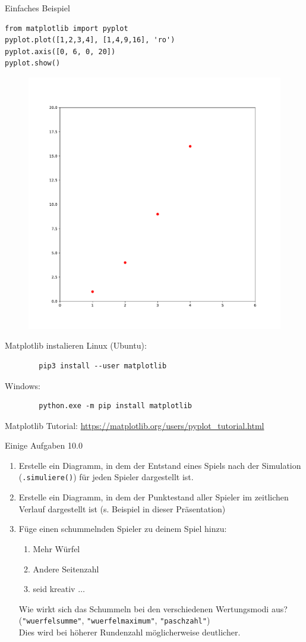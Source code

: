 \begin{frame}[fragile]{Einfaches Beispiel}
	\begin{lstlisting}
from matplotlib import pyplot
pyplot.plot([1,2,3,4], [1,4,9,16], 'ro')
pyplot.axis([0, 6, 0, 20])
pyplot.show()
	\end{lstlisting}
	
	\begin{figure}[h]
		\includegraphics[width=.5\linewidth]{../images/matplotlib_example1}
	\end{figure}
\end{frame}

\begin{frame}[fragile]{Matplotlib instalieren}
	Linux (Ubuntu):
	\begin{lstlisting}
		pip3 install --user matplotlib
	\end{lstlisting}
	
	Windows:
	\begin{lstlisting}
		python.exe -m pip install matplotlib
	\end{lstlisting}
	Matplotlib Tutorial: \url{https://matplotlib.org/users/pyplot_tutorial.html}
\end{frame}

\begin{frame}{Einige Aufgaben 10.0}
	\begin{enumerate}
		\item Erstelle ein Diagramm, in dem der Entstand eines Spiels nach der Simulation (\texttt{.simuliere()}) für jeden Spieler dargestellt ist.
		\item Erstelle ein Diagramm, in dem der Punktestand aller Spieler im zeitlichen Verlauf dargestellt ist (s. Beispiel in dieser Präsentation)
		\item Füge einen schummelnden Spieler zu deinem Spiel hinzu:
		\begin{enumerate}
			\item Mehr Würfel
			\item Andere Seitenzahl
			\item seid kreativ $\dots$
		\end{enumerate}
		Wie wirkt sich das Schummeln bei den verschiedenen Wertungsmodi aus? \\
		(\texttt{"wuerfelsumme"}, \texttt{"wuerfelmaximum"}, \texttt{"paschzahl"})\\
		Dies wird bei höherer Rundenzahl möglicherweise deutlicher.
	\end{enumerate}
\end{frame}

